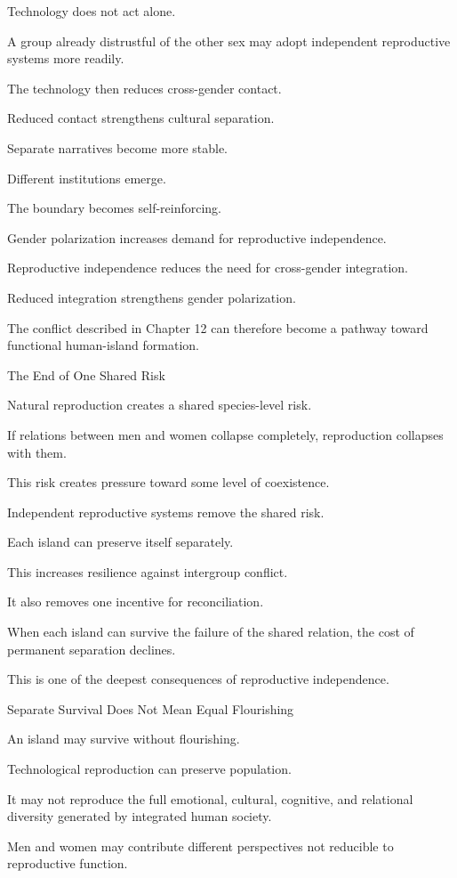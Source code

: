 Technology does not act alone.

A group already distrustful of the other sex may adopt independent reproductive systems more readily.

The technology then reduces cross-gender contact.

Reduced contact strengthens cultural separation.

Separate narratives become more stable.

Different institutions emerge.

The boundary becomes self-reinforcing.

Gender polarization increases demand for reproductive independence.

Reproductive independence reduces the need for cross-gender integration.

Reduced integration strengthens gender polarization.

The conflict described in Chapter 12 can therefore become a pathway toward functional human-island formation.

The End of One Shared Risk

Natural reproduction creates a shared species-level risk.

If relations between men and women collapse completely, reproduction collapses with them.

This risk creates pressure toward some level of coexistence.

Independent reproductive systems remove the shared risk.

Each island can preserve itself separately.

This increases resilience against intergroup conflict.

It also removes one incentive for reconciliation.

When each island can survive the failure of the shared relation, the cost of permanent separation declines.

This is one of the deepest consequences of reproductive independence.

Separate Survival Does Not Mean Equal Flourishing

An island may survive without flourishing.

Technological reproduction can preserve population.

It may not reproduce the full emotional, cultural, cognitive, and relational diversity generated by integrated human society.

Men and women may contribute different perspectives not reducible to reproductive function.

